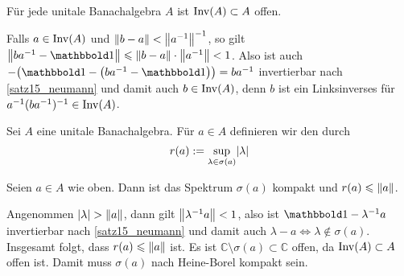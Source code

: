 \begin{korollar}[{name=[Invertierbare Elemente bilden offene Menge]},label=inv_offen]
	Für jede unitale Banachalgebra $A$ ist $\operatorname{Inv}(A) \subset A$ offen.
\end{korollar}
\begin{beweis}
	Falls $a \in \operatorname{Inv}(A)$ und $\norm{b-a} < \norm{a^{-1}}^{-1}$, so gilt $\norm{b a^{-1} -\ind} \le \norm{b-a} \cdot \norm{a^{-1}}<1$.  Also ist auch
	$-\enbrace*{\ind- \enbrace*{ba^{-1} -\ind}} = ba^{-1}$ invertierbar nach \autoref{satz15_neumann} und damit auch $b \in \operatorname{Inv}(A)$, denn $b$ ist ein Linksinverses für 
	$a^{-1}(ba^{-1})^{-1} \in \operatorname{Inv}(A)$.
\end{beweis}

\begin{definition}[{name=[Spektralradius]}]
	Sei $A$ eine unitale Banachalgebra. Für $a \in A$ definieren wir den  durch
	\[
		r(a) := \sup_{\lambda \in \sigma(a)} \lvert\lambda\rvert 
	\] 
\end{definition}

\begin{proposition}[{name=[Spektrum ist kompakt und Spektralradius durch Norm beschränkt]},label=spec_kompakt]
	Seien $a \in A$ wie oben. Dann ist das Spektrum $\sigma(a)$ kompakt und $r(a) \le \norm{a}$.
\end{proposition}
\begin{beweis}
	Angenommen $\abs{\lambda} > \norm{a}$, dann gilt $\norm{\lambda^{-1} a} < 1$, also ist $\ind- \lambda^{-1} a$ invertierbar nach \autoref{satz15_neumann} und 
	damit auch $\lambda -a \iff \lambda \notin \sigma(a)$. Insgesamt folgt, dass $r(a) \le \norm{a}$ ist. 	
	Es ist $\mathbb{C} \setminus \sigma(a) \subset \mathbb{C}$ offen, da $\operatorname{Inv}(A) \subset A$ offen ist. Damit muss $\sigma(a)$ nach Heine-Borel kompakt sein. 
\end{beweis}

